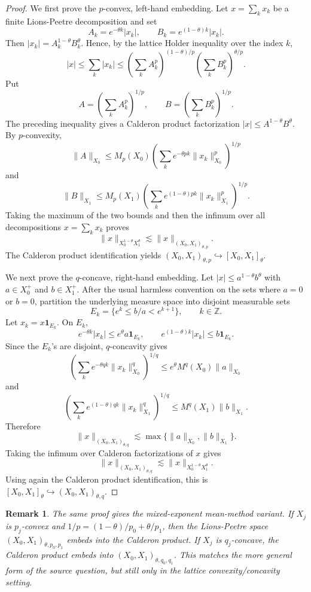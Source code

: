 \documentclass[11pt]{article}
\newtheorem{remark}{Remark}
\begin{document}
\begin{proof}
We first prove the \(p\)-convex, left-hand embedding.  Let
\(x=\sum_k x_k\) be a finite Lions-Peetre decomposition and set
\[
A_k=e^{-\theta k}|x_k|,\qquad
B_k=e^{(1-\theta)k}|x_k|.
\]
Then \( |x_k|=A_k^{1-\theta}B_k^\theta\).  Hence, by the lattice Holder
inequality over the index \(k\),
\[
|x|\leq\sum_k |x_k|
\leq
\left(\sum_k A_k^p\right)^{(1-\theta)/p}
\left(\sum_k B_k^p\right)^{\theta/p}.
\]
Put
\[
A=\left(\sum_k A_k^p\right)^{1/p},\qquad
B=\left(\sum_k B_k^p\right)^{1/p}.
\]
The preceding inequality gives a Calderon product factorization
\(|x|\leq A^{1-\theta}B^\theta\).  By \(p\)-convexity,
\[
\|A\|_{X_0}
\leq M_p(X_0)
\left(\sum_k e^{-\theta pk}\|x_k\|_{X_0}^p\right)^{1/p}
\]
and
\[
\|B\|_{X_1}
\leq M_p(X_1)
\left(\sum_k e^{(1-\theta)pk}\|x_k\|_{X_1}^p\right)^{1/p}.
\]
Taking the maximum of the two bounds and then the infimum over all
decompositions \(x=\sum_k x_k\) proves
\[
\|x\|_{X_0^{1-\theta}X_1^\theta}
\lesssim
\|x\|_{(X_0,X_1)_{\theta,p}}.
\]
The Calderon product identification yields
\((X_0,X_1)_{\theta,p}\hookrightarrow [X_0,X_1]_\theta\).

We next prove the \(q\)-concave, right-hand embedding.  Let
\(|x|\leq a^{1-\theta}b^\theta\) with \(a\in X_0^+\) and \(b\in X_1^+\).
After the usual harmless convention on the sets where \(a=0\) or \(b=0\),
partition the underlying measure space into disjoint measurable sets
\[
E_k=\{e^k\leq b/a<e^{k+1}\},\qquad k\in\mathbb Z.
\]
Let \(x_k=x\mathbf 1_{E_k}\).  On \(E_k\),
\[
e^{-\theta k}|x_k|
\leq e^\theta a\mathbf 1_{E_k},
\qquad
e^{(1-\theta)k}|x_k|
\leq b\mathbf 1_{E_k}.
\]
Since the \(E_k\)'s are disjoint, \(q\)-concavity gives
\[
\left(\sum_k e^{-\theta qk}\|x_k\|_{X_0}^q\right)^{1/q}
\leq e^\theta M^q(X_0)\|a\|_{X_0}
\]
and
\[
\left(\sum_k e^{(1-\theta)qk}\|x_k\|_{X_1}^q\right)^{1/q}
\leq M^q(X_1)\|b\|_{X_1}.
\]
Therefore
\[
\|x\|_{(X_0,X_1)_{\theta,q}}
\lesssim
\max\{\|a\|_{X_0},\|b\|_{X_1}\}.
\]
Taking the infimum over Calderon factorizations of \(x\) gives
\[
\|x\|_{(X_0,X_1)_{\theta,q}}
\lesssim
\|x\|_{X_0^{1-\theta}X_1^\theta}.
\]
Using again the Calderon product identification, this is
\([X_0,X_1]_\theta\hookrightarrow (X_0,X_1)_{\theta,q}\).
\end{proof}

\begin{remark}
The same proof gives the mixed-exponent mean-method variant.  If \(X_j\) is
\(p_j\)-convex and \(1/p=(1-\theta)/p_0+\theta/p_1\), then the Lions-Peetre
space \((X_0,X_1)_{\theta,p_0,p_1}\) embeds into the Calderon product.  If
\(X_j\) is \(q_j\)-concave, the Calderon product embeds into
\((X_0,X_1)_{\theta,q_0,q_1}\).  This matches the more general form of the
source question, but still only in the lattice convexity/concavity setting.
\end{remark}
\end{document}

